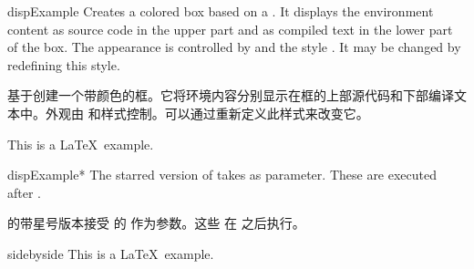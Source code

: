 {\let\xdispExample\dispExample
\let\endxdispExample\enddispExample
\begin{docEnvironment}[doc updated=2014-10-10]{dispExample}{}
Creates a colored box based on a .
It displays the environment content as source code in the upper part
and as compiled text in the lower part of the box.
The appearance is controlled by 
and the style . It may be
changed by redefining this style.

基于创建一个带颜色的框。它将环境内容分别显示在框的上部源代码和下部编译文本中。外观由 和样式控制。可以通过重新定义此样式来改变它。
{
\begin{xdispExample}
\begin{dispExample}
This is a \LaTeX\ example.
\end{dispExample}
\end{xdispExample}
}
\end{docEnvironment}}


{\let\xdispExample\dispExample
\let\endxdispExample\enddispExample
\begin{docEnvironment}[doc updated=2014-10-10]{dispExample*}{}
The starred version of  takes  
as parameter. These  are executed after .

 的带星号版本接受  的  作为参数。这些  在  之后执行。
\begin{xdispExample}
\begin{dispExample*}{sidebyside}
This is a \LaTeX\ example.
\end{dispExample*}
\end{xdispExample}
\end{docEnvironment}}